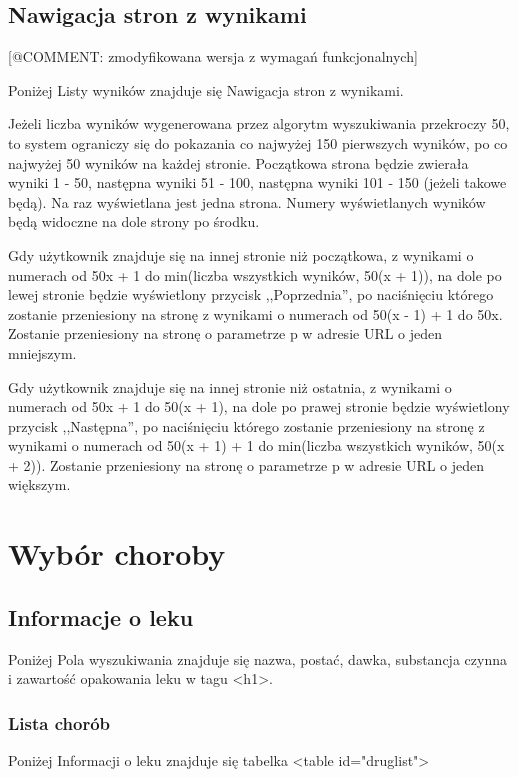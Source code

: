 \documentclass{article}
\begin{document}
\subsection{Nawigacja stron z wynikami}

[@COMMENT: zmodyfikowana wersja z wymagań funkcjonalnych]

Poniżej Listy wyników znajduje się Nawigacja stron z wynikami.

Jeżeli liczba wyników wygenerowana przez algorytm wyszukiwania przekroczy 50, to system ograniczy się do pokazania co najwyżej 150 pierwszych wyników, po co najwyżej 50 wyników na każdej stronie. Początkowa strona będzie zwierała wyniki 1 - 50, następna wyniki 51 - 100, następna wyniki 101 - 150 (jeżeli takowe będą). Na raz wyświetlana jest jedna strona. Numery wyświetlanych wyników będą widoczne na dole strony po środku.

Gdy użytkownik znajduje się na innej stronie niż początkowa, z wynikami o numerach od 50x + 1 do min(liczba wszystkich wyników, 50(x + 1)), na dole po lewej stronie będzie wyświetlony przycisk ,,Poprzednia'', po naciśnięciu którego zostanie przeniesiony na stronę z wynikami o numerach od 50(x - 1) + 1 do 50x. Zostanie przeniesiony na stronę o parametrze p w adresie URL o jeden mniejszym.

Gdy użytkownik znajduje się na innej stronie niż ostatnia, z wynikami o numerach od 50x + 1 do 50(x + 1), na dole po prawej stronie będzie wyświetlony przycisk ,,Następna'', po naciśnięciu którego zostanie przeniesiony na stronę z wynikami o numerach od 50(x + 1) + 1 do min(liczba wszystkich wyników, 50(x + 2)). Zostanie przeniesiony na stronę o parametrze p w adresie URL o jeden większym.

\section{Wybór choroby}

\subsection{Informacje o leku}

Poniżej Pola wyszukiwania znajduje się nazwa, postać, dawka, substancja czynna i zawartość opakowania leku w tagu <h1>.

\subsubsection{Lista chorób}

Poniżej Informacji o leku znajduje się tabelka <table id="druglist">
\end{document}
